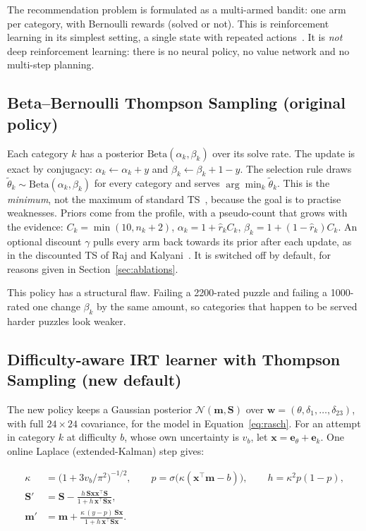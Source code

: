 The recommendation problem is formulated as a multi-armed bandit: one arm per category, with Bernoulli
rewards (solved or not). This is reinforcement learning in its simplest setting, a single state with
repeated actions~\cite{sutton2018reinforcement}. It is \emph{not} deep reinforcement learning: there is
no neural policy, no value network and no multi-step planning.

\subsection{Beta--Bernoulli Thompson Sampling (original policy)}

Each category $k$ has a posterior $\text{Beta}(\alpha_k,\beta_k)$ over its solve rate. The update is
exact by conjugacy: $\alpha_k \leftarrow \alpha_k + y$ and $\beta_k \leftarrow \beta_k + 1 - y$. The
selection rule draws $\tilde\theta_k \sim \text{Beta}(\alpha_k,\beta_k)$ for every category and serves
$\arg\min_k \tilde\theta_k$. This is the \emph{minimum}, not the maximum of standard
TS~\cite{russo2018tutorial}, because the goal is to practise weaknesses. Priors come from the profile,
with a pseudo-count that grows with the evidence: $C_k = \min(10, n_k+2)$, $\alpha_k = 1 + \hat
r_k C_k$, $\beta_k = 1 + (1-\hat r_k) C_k$. An optional discount $\gamma$ pulls every arm back towards
its prior after each update, as in the discounted TS of Raj and Kalyani~\cite{raj2017taming}. It is
switched off by default, for reasons given in Section~\ref{sec:ablations}.

This policy has a structural flaw. Failing a 2200-rated puzzle and failing a 1000-rated one change
$\beta_k$ by the same amount, so categories that happen to be served harder puzzles look weaker.

\subsection{Difficulty-aware IRT learner with Thompson Sampling (new default)}

The new policy keeps a Gaussian posterior $\mathcal{N}(\mathbf{m}, \mathbf{S})$ over $\mathbf{w} =
(\theta, \delta_1,\dots,\delta_{23})$, with full $24\times24$ covariance, for the model in
Equation~\eqref{eq:rasch}. For an attempt in category $k$ at difficulty $b$, whose own uncertainty is
$v_b$, let $\mathbf{x} = \mathbf{e}_\theta + \mathbf{e}_k$. One online Laplace (extended-Kalman) step
gives:

\begin{align}
  \kappa &= \bigl(1 + 3 v_b / \pi^2\bigr)^{-1/2}, \qquad
  p = \sigma\!\bigl(\kappa(\mathbf{x}^\top\mathbf{m} - b)\bigr), \qquad
  h = \kappa^2 p(1-p), \\
  \mathbf{S}' &= \mathbf{S} - \frac{h\,\mathbf{S}\mathbf{x}\mathbf{x}^\top\mathbf{S}}{1 + h\,\mathbf{x}^\top\mathbf{S}\mathbf{x}}, \\
  \mathbf{m}' &= \mathbf{m} + \frac{\kappa\,(y - p)\,\mathbf{S}\mathbf{x}}{1 + h\,\mathbf{x}^\top\mathbf{S}\mathbf{x}}.
\end{align}

